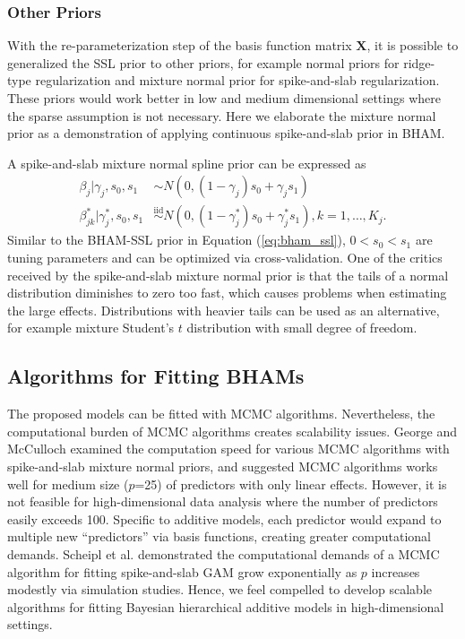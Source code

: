 \documentclass[AMA,STIX1COL,]{WileyNJD-v2}
\begin{document}
\hypertarget{other-priors}{%
\subsubsection{Other Priors}\label{other-priors}}

With the re-parameterization step of the basis function matrix
\(\boldsymbol{X}\), it is possible to generalized the SSL prior to other
priors, for example normal priors for ridge-type regularization and
mixture normal prior for spike-and-slab regularization. These priors
would work better in low and medium dimensional settings where the
sparse assumption is not necessary. Here we elaborate the mixture normal
prior as a demonstration of applying continuous spike-and-slab prior in
BHAM.

A spike-and-slab mixture normal spline prior can be expressed as
\begin{align*}
  \beta_{j} |\gamma_{j},s_0,s_1 &\sim N(0,(1-\gamma_{j}) s_0 + \gamma_{j} s_1)\\
  \beta^*_{jk} | \gamma^*_{j},s_0,s_1 &\overset{\text{iid}}{\sim}N(0,(1-\gamma^*_{j}) s_0 + \gamma^*_{j} s_1), k=1,\dots, K_j.
\end{align*} Similar to the BHAM-SSL prior in Equation
(\ref{eq:bham_ssl}), \(0 < s_0 < s_1\) are tuning parameters and can be
optimized via cross-validation. One of the critics received by the
spike-and-slab mixture normal prior is that the tails of a normal
distribution diminishes to zero too fast, which causes problems when
estimating the large effects. Distributions with heavier tails can be
used as an alternative, for example mixture Student's \(t\) distribution
with small degree of freedom.

\hypertarget{algorithms-for-fitting-bhams}{%
\subsection{Algorithms for Fitting
BHAMs}\label{algorithms-for-fitting-bhams}}

The proposed models can be fitted with MCMC algorithms. Nevertheless,
the computational burden of MCMC algorithms creates scalability issues.
George and McCulloch\citep{George1997} examined the computation speed
for various MCMC algorithms with spike-and-slab mixture normal priors,
and suggested MCMC algorithms works well for medium size (\(p\)=25) of
predictors with only linear effects. However, it is not feasible for
high-dimensional data analysis where the number of predictors easily
exceeds 100. Specific to additive models, each predictor would expand to
multiple new ``predictors'' via basis functions, creating greater
computational demands. Scheipl et al. \citep{Scheipl2013} demonstrated
the computational demands of a MCMC algorithm for fitting spike-and-slab
GAM grow exponentially as \(p\) increases modestly via simulation
studies. Hence, we feel compelled to develop scalable algorithms for
fitting Bayesian hierarchical additive models in high-dimensional
settings.
\end{document}
